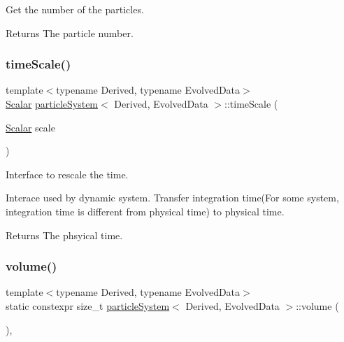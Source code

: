Get the number of the particles. 

\begin{DoxyReturn}{Returns}
The particle number. 
\end{DoxyReturn}
\mbox{\label{classparticle_system_a973f0cdc8c8ab21c65e57b8729207551}} 
\subsubsection{\texorpdfstring{time\+Scale()}{timeScale()}}
{\footnotesize\ttfamily template$<$typename Derived, typename Evolved\+Data$>$ \\
\mbox{\hyperlink{classparticle_system_a28e49da72c0ca5786d0611e6128a8994}{Scalar}} \mbox{\hyperlink{classparticle_system}{particle\+System}}$<$ Derived, Evolved\+Data $>$\+::time\+Scale (\begin{DoxyParamCaption}\item[{\mbox{\hyperlink{classparticle_system_a28e49da72c0ca5786d0611e6128a8994}{Scalar}}}]{scale }\end{DoxyParamCaption})\hspace{0.3cm}{\ttfamily [inline]}}



Interface to rescale the time. 

Interace used by dynamic system. Transfer integration time(For some system, integration time is different from physical time) to physical time. \begin{DoxyReturn}{Returns}
The phsyical time. 
\end{DoxyReturn}
\mbox{\label{classparticle_system_aac9e6701e4486c89b508a2508b77089b}} 
\subsubsection{\texorpdfstring{volume()}{volume()}}
{\footnotesize\ttfamily template$<$typename Derived, typename Evolved\+Data$>$ \\
static constexpr size\+\_\+t \mbox{\hyperlink{classparticle_system}{particle\+System}}$<$ Derived, Evolved\+Data $>$\+::volume (\begin{DoxyParamCaption}{ }\end{DoxyParamCaption})\hspace{0.3cm}{\ttfamily [inline]}, {\ttfamily [static]}}



